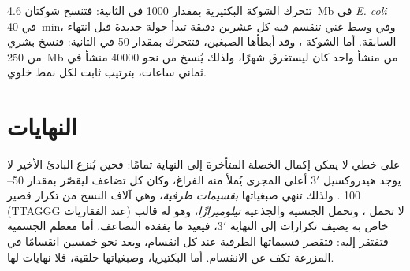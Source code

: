 \begin{example}\label{ex:b1:replication-mitosis:speed}
تتحرك الشوكة البكتيرية بمقدار \qty{1000}{}  في الثانية: فتنسخ شوكتان
\qty{4.6}{Mb} في \emph{E. coli} في \qty{40}{min}، وفي وسط غني تنقسم
فيه  كل عشرين دقيقة تبدأ جولة جديدة قبل انتهاء السابقة. أما
الشوكة ، وقد أبطأها الصبغين، فتتحرك بمقدار \qty{50}{} في الثانية:
فنسخ  بشري من \qty{250}{Mb} من منشأ واحد كان ليستغرق شهرًا،
ولذلك يُنسخ  من نحو \num{40000} منشأ في ثماني ساعات، بترتيب
ثابت لكل نمط خلوي.
\end{example}

\section{النهايات}

\begin{proposition}\label{prop:b1:replication-mitosis:telomerase}
على  خطي لا يمكن إكمال الخصلة المتأخرة إلى النهاية تمامًا: فحين
يُنزع البادئ الأخير لا يوجد هيدروكسيل $3'$ أعلى المجرى يُملأ منه
الفراغ، وكان كل تضاعف ليقصّر  بمقدار \qtyrange{50}{100}{}
. ولذلك تنهي  صبغياتها \emph{بقسيمات طرفية}،
وهي آلاف النسخ من تكرار قصير (TTAGGG عند الفقاريات) لا تحمل
، وتحمل  الجنسية والجذعية \emph{تيلوميرازًا}، وهو 
له قالب  خاص به يضيف تكرارات إلى النهاية $3'$، فيعيد ما يفقده
التضاعف. أما معظم  الجسمية فتفتقر إليه: فتقصر قسيماتها الطرفية
عند كل انقسام، وبعد نحو خمسين انقسامًا في المزرعة تكف عن الانقسام.
أما البكتيريا، وصبغياتها حلقية، فلا نهايات لها.
\end{proposition}

